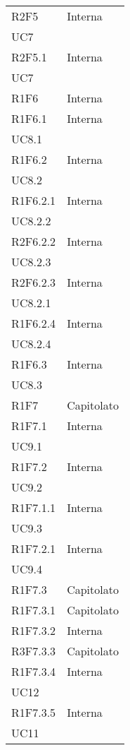 \begin{longtable}{|C{6.5cm}|C{6.5cm}|}
	R2F5 &  \centering Interna \\ UC7 \tabularnewline
	
	R2F5.1 &  \centering Interna \\ UC7 \tabularnewline
	
	R1F6 & Interna \\
	
	R1F6.1 & \centering Interna \\ UC8.1 \tabularnewline
	
	R1F6.2 & \centering Interna \\ UC8.2 \tabularnewline
	
	R1F6.2.1 & \centering Interna \\ UC8.2.2 \tabularnewline
	
	R2F6.2.2 & \centering Interna \\ UC8.2.3 \tabularnewline
	
	R2F6.2.3 & \centering Interna \\ UC8.2.1 \tabularnewline
	
	R1F6.2.4 & \centering Interna \\ UC8.2.4 \tabularnewline
	
	R1F6.3 & \centering Interna \\ UC8.3 \tabularnewline
	
	R1F7 & Capitolato \\
	
	R1F7.1 & \centering Interna \\ UC9.1 \tabularnewline
	
	R1F7.2 &  \centering Interna \\ UC9.2 \tabularnewline
	
	R1F7.1.1 & \centering Interna \\ UC9.3 \tabularnewline
	
	R1F7.2.1 &   \centering Interna \\ UC9.4 \tabularnewline
	
	R1F7.3 &   Capitolato \\
	
	R1F7.3.1 &  Capitolato \\
	
	R1F7.3.2 &  Interna \\
	
	R3F7.3.3 &  Capitolato \\
	
	R1F7.3.4 &  \centering Interna \\ UC12 \tabularnewline
	
	R1F7.3.5 & \centering Interna \\ UC11 \tabularnewline
	

\end{longtable}
